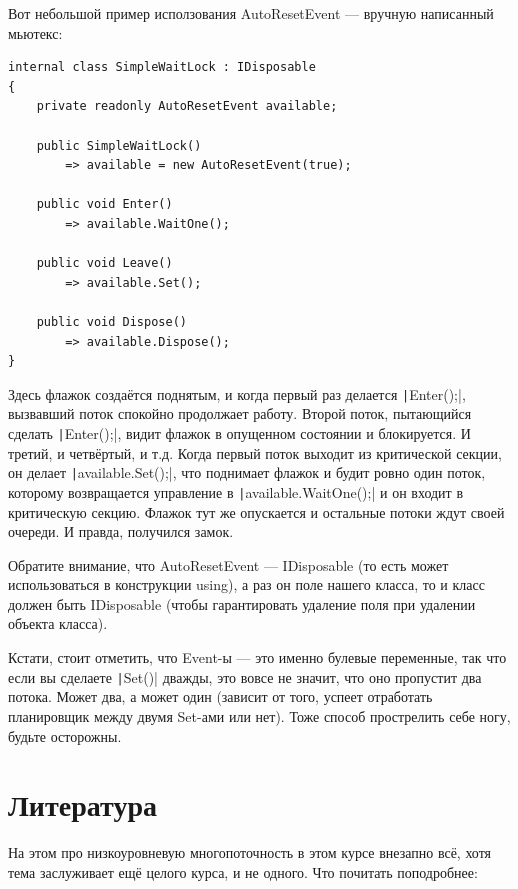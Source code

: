 \documentclass{../../text-style}
\begin{document}
Вот небольшой пример исползования AutoResetEvent --- вручную написанный мьютекс:

\begin{verbatim}
internal class SimpleWaitLock : IDisposable 
{
    private readonly AutoResetEvent available;
    
    public SimpleWaitLock() 
        => available = new AutoResetEvent(true); 

    public void Enter() 
        => available.WaitOne();

    public void Leave() 
        => available.Set();

    public void Dispose() 
        => available.Dispose();
}
\end{verbatim}

Здесь флажок создаётся поднятым, и когда первый раз делается \texttt|Enter();|, вызвавший поток спокойно продолжает работу. Второй поток, пытающийся сделать \texttt|Enter();|, видит флажок в опущенном состоянии и блокируется. И третий, и четвёртый, и т.д. Когда первый поток выходит из критической секции, он делает \texttt|available.Set();|, что поднимает флажок и будит ровно один поток, которому возвращается управление в \texttt|available.WaitOne();| и он входит в критическую секцию. Флажок тут же опускается и остальные потоки ждут своей очереди. И правда, получился замок. 

Обратите внимание, что AutoResetEvent --- IDisposable (то есть может использоваться в конструкции using), а раз он поле нашего класса, то и класс должен быть IDisposable (чтобы гарантировать удаление поля при удалении объекта класса). 

Кстати, стоит отметить, что Event-ы --- это именно булевые переменные, так что если вы сделаете \texttt|Set()| дважды, это вовсе не значит, что оно пропустит два потока. Может два, а может один (зависит от того, успеет отработать планировщик между двумя Set-ами или нет). Тоже способ прострелить себе ногу, будьте осторожны.

\section{Литература}

На этом про низкоуровневую многопоточность в этом курсе внезапно всё, хотя тема заслуживает ещё целого курса, и не одного. Что почитать поподробнее:
\end{document}
